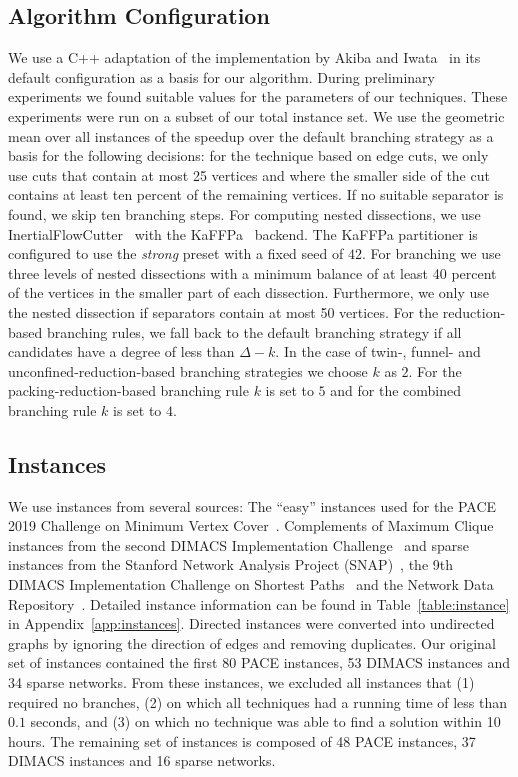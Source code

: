 \documentclass[a4paper,UKenglish,cleveref, autoref, thm-restate]{lipics-v2021}
\begin{document}
\subsection{Algorithm Configuration}\label{sec:algo_conf}
We use a C++ adaptation of the implementation by Akiba and
Iwata~\cite{AkibaIwata} in its default configuration as a basis for our algorithm. During preliminary experiments we found
suitable values for the parameters of
our techniques. These experiments were run on a subset of our total instance
set. We use the geometric mean over all instances of the speedup over the
default branching strategy as a basis for the following decisions: for the technique based on
edge cuts, we only use cuts that contain at most 25 vertices and where the smaller side of
the cut contains at least ten percent of the remaining vertices. If no suitable separator is found, we skip ten branching steps. For computing nested dissections, we use 
InertialFlowCutter~\cite{gottesburen2019faster}
with the KaFFPa~\cite{DBLP:conf/wea/SandersS13}
backend. The KaFFPa partitioner is configured to use the \emph{strong} preset
with a fixed seed of $42$. For branching we use
three levels of nested dissections with a minimum balance of at least 40 percent of the vertices in the smaller part of each dissection. Furthermore, we
only use the nested dissection if separators contain at most
50 vertices. For the reduction-based
branching rules, we fall back to the default branching strategy if all
candidates have a degree of less than $\Delta - k$. In the case of twin-, funnel- and unconfined-reduction-based branching strategies we choose $k$ as $2$. For the packing-reduction-based branching rule $k$ is set to $5$ and for the combined branching rule $k$ is set to $4$.

\subsection{Instances}
We use instances from several sources: The ``easy'' instances used for the
PACE 2019 Challenge on Minimum Vertex Cover~\cite{dzulfikar_et_al:LIPIcs:2019:11486}. 
Complements of Maximum Clique instances from the second DIMACS Implementation Challenge~\cite{johnson1993cliques} and sparse instances from
the Stanford Network Analysis Project (SNAP)~\cite{snapnets}, the 9th DIMACS
Implementation Challenge on Shortest Paths~\cite{demetrescu2009shortest} and the
Network Data Repository~\cite{nr}. Detailed instance information can
be found in Table~\ref{table:instance} in Appendix~\ref{app:instances}. Directed instances were converted into
undirected graphs by ignoring the direction of edges and removing duplicates.
Our original set of instances contained the first 80 PACE instances, 53 DIMACS instances and 34 sparse networks.
From these instances, we excluded all instances that (1) required no branches, (2) on which all techniques had a running time of less than $0.1$ seconds, and (3) on which no technique was able to find a solution within 10 hours.
The remaining set of instances is composed of 48 PACE instances, 37 DIMACS instances and 16 sparse networks.
\end{document}
